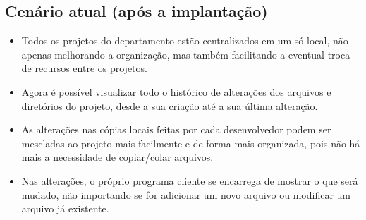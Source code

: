 \subsection{Cenário atual (após a implantação)}

\begin{itemize}
 \item Todos os projetos do departamento estão centralizados em um só local, não apenas melhorando a organização, mas também facilitando a eventual troca de recursos entre os projetos.
 \item Agora é possível visualizar todo o histórico de alterações dos arquivos e diretórios do projeto, desde a sua criação até a sua última alteração.
 \item As alterações nas cópias locais feitas por cada desenvolvedor podem ser mescladas ao projeto mais facilmente e de forma mais organizada, pois não há mais a necessidade de copiar/colar arquivos.
 \item Nas alterações, o próprio programa cliente se encarrega de mostrar o que será mudado, não importando se for adicionar um novo arquivo ou modificar um arquivo já existente.
\end{itemize}


